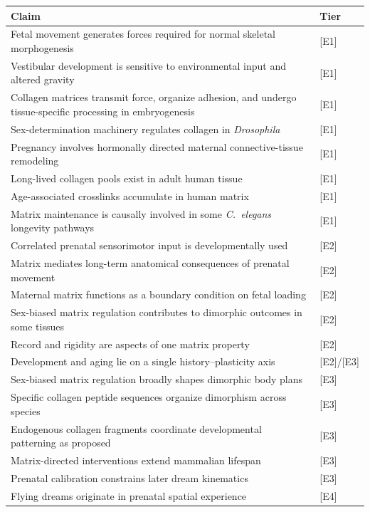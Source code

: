 \documentclass[11pt,a4paper]{article}
\theoremstyle{plain}
\theoremstyle{definition}
\theoremstyle{remark}
\newcommand{\tier}[1]{\textup{\textsc{[#1]}}}
\newcommand{\Eone}{\tier{E1}}
\newcommand{\Etwo}{\tier{E2}}
\newcommand{\Ethree}{\tier{E3}}
\newcommand{\Efour}{\tier{E4}}
\begin{document}
\begin{center}
\small
\begin{longtable}{@{}p{}l@{}}
\toprule
\textbf{Claim} & \textbf{Tier} \\
\midrule
\endhead
Fetal movement generates forces required for normal skeletal morphogenesis & \Eone \\
Vestibular development is sensitive to environmental input and altered gravity & \Eone \\
Collagen matrices transmit force, organize adhesion, and undergo tissue-specific processing in embryogenesis & \Eone \\
Sex-determination machinery regulates collagen in \emph{Drosophila} & \Eone \\
Pregnancy involves hormonally directed maternal connective-tissue remodeling & \Eone \\
Long-lived collagen pools exist in adult human tissue & \Eone \\
Age-associated crosslinks accumulate in human matrix & \Eone \\
Matrix maintenance is causally involved in some \emph{C.\ elegans} longevity pathways & \Eone \\
Correlated prenatal sensorimotor input is developmentally used & \Etwo \\
Matrix mediates long-term anatomical consequences of prenatal movement & \Etwo \\
Maternal matrix functions as a boundary condition on fetal loading & \Etwo \\
Sex-biased matrix regulation contributes to dimorphic outcomes in some tissues & \Etwo \\
Record and rigidity are aspects of one matrix property & \Etwo \\
Development and aging lie on a single history--plasticity axis & \Etwo/\Ethree \\
Sex-biased matrix regulation broadly shapes dimorphic body plans & \Ethree \\
Specific collagen peptide sequences organize dimorphism across species & \Ethree \\
Endogenous collagen fragments coordinate developmental patterning as proposed & \Ethree \\
Matrix-directed interventions extend mammalian lifespan & \Ethree \\
Prenatal calibration constrains later dream kinematics & \Ethree \\
Flying dreams originate in prenatal spatial experience & \Efour \\
\bottomrule
\end{longtable}
\end{center}
\end{document}
